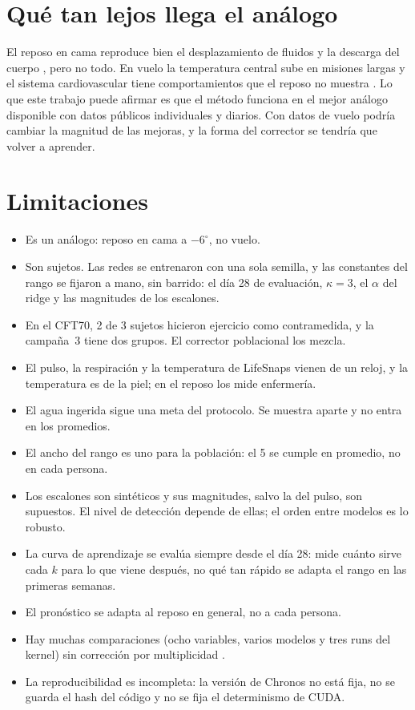 \section{Qué tan lejos llega el análogo}

El reposo en cama reproduce bien el desplazamiento de fluidos y la descarga del cuerpo \parencite{pavy2007,hargens2016},
pero no todo. En vuelo la temperatura central sube en misiones largas \parencite{stahn2017} y el sistema cardiovascular
tiene comportamientos que el reposo no muestra \parencite{norsk2020}. Lo que este trabajo puede afirmar es que el
método funciona en el mejor análogo disponible con datos públicos individuales y diarios. Con datos de vuelo podría
cambiar la magnitud de las mejoras, y la forma del corrector se tendría que volver a aprender.

\section{Limitaciones}\label{sec:limitaciones}

\begin{itemize}
\item Es un análogo: reposo en cama a $-6^\circ$, no vuelo.
\item Son  sujetos. Las redes se entrenaron con una sola semilla, y las constantes del rango se
  fijaron a mano, sin barrido: el día 28 de evaluación, $\kappa = 3$, el $\alpha$ del ridge y las magnitudes de los
  escalones.
\item En el CFT70, 2 de 3 sujetos hicieron ejercicio como contramedida, y la campaña~3 tiene dos grupos. El corrector
  poblacional los mezcla.
\item El pulso, la respiración y la temperatura de LifeSnaps vienen de un reloj, y la temperatura es de la piel; en el
  reposo los mide enfermería.
\item El agua ingerida sigue una meta del protocolo. Se muestra aparte y no entra en los promedios.
\item El ancho del rango es uno para la población: el 5\pct{} se cumple en promedio, no en cada persona.
\item Los escalones son sintéticos y sus magnitudes, salvo la del pulso, son supuestos. El nivel de detección depende
  de ellas; el orden entre modelos es lo robusto.
\item La curva de aprendizaje se evalúa siempre desde el día 28: mide cuánto sirve cada $k$ para lo que viene después,
  no qué tan rápido se adapta el rango en las primeras semanas.
\item El pronóstico se adapta al reposo en general, no a cada persona.
\item Hay muchas comparaciones (ocho variables, varios modelos y tres runs del kernel) sin corrección por
  multiplicidad \parencite{benjamini1995}.
\item La reproducibilidad es incompleta: la versión de Chronos no está fija, no se guarda el hash del código y no se
  fija el determinismo de CUDA.
\end{itemize}
